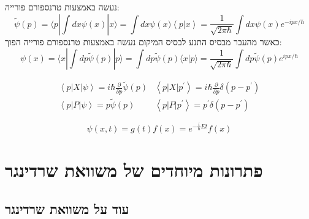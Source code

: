 \documentclass{tstextbook}
\begin{document}
\begin{proposition}
נעשה באמצעות טרנספורם פורייה:
$$\widetilde{\psi}(p)=\langle p|\int d x\psi(x)|x  \rangle =\int d x\psi\left(x)\left\langle p\right|x\right\rangle=\frac{1}{\sqrt{2\pi\hbar}}\int d x\psi\left(x\right)e^{-i p x/\hbar}$$
כאשר מהעבר מבסיס התנע לבסיס המיקום נעשה באמצעות טרנספורם פורייה הפוך:
$$\psi(x)=\langle x|\int d p\widetilde{\psi}(p)|p\rangle=\int d p\widetilde{\psi}(p) \langle x|p\rangle=\frac{1}{\sqrt{2\pi\hbar}}\int d p\widetilde{\psi}(p)e^{i p x/\hbar}$$

\end{proposition}
\begin{proposition}
$$\begin{gather}\left\langle  p|X|\psi \right\rangle=i\hbar{\frac{\partial}{\partial p}}\tilde{\psi}(p)&\left\langle  p|X|p^{\prime} \right\rangle=i\hbar{\frac{\partial}{\partial p}}\delta\left( p-p^{\prime} \right)\\ \left\langle  p|P|\psi \right\rangle=p\tilde{\psi}(p)& \left\langle  p|P|p^{\prime} \right\rangle=p^{\prime}\delta\left( p-p^{\prime} \right) 
\end{gather}$$

\end{proposition}
\begin{proposition}
$$\psi(x,t)=g(t)f(x)=e^{-{\frac{i}{\hbar}}E t}f(x)$$

\end{proposition}
\section{פתרונות מיוחדים של משוואת שרדינגר}

\subsection{עוד על משוואת שרדינגר}
\end{document}
